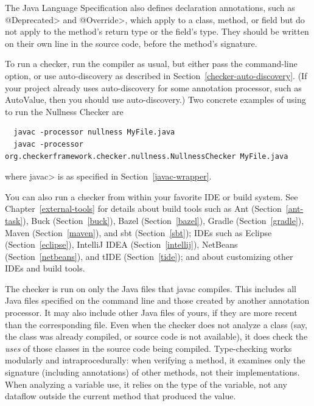 The Java Language Specification also defines
declaration annotations, such as \<@Deprecated> and \<@Override>, which apply
to a class, method, or field but do not apply to the method's return type
or the field's type.  They should be written on their own line in the
source code, before the method's signature.



To run a checker, run the compiler  as usual,
but either pass the  command-line
option, or use auto-discovery as described in
Section~\ref{checker-auto-discovery}.
(If your project already uses auto-discovery for some annotation processor,
such as AutoValue, then you should use auto-discovery.)
Two concrete examples of using  to run the Nullness Checker are

\begin{Verbatim}
  javac -processor nullness MyFile.java
  javac -processor org.checkerframework.checker.nullness.NullnessChecker MyFile.java
\end{Verbatim}

\noindent
where \<javac> is as specified in Section~\ref{javac-wrapper}.

You can also run a checker from within your favorite IDE or build system.  See
Chapter~\ref{external-tools} for details about build tools such as
Ant (Section~\ref{ant-task}),
Buck (Section~\ref{buck}),
Bazel (Section~\ref{bazel}),
Gradle (Section~\ref{gradle}),
Maven (Section~\ref{maven}), and
sbt (Section~\ref{sbt});
IDEs such as
Eclipse (Section~\ref{eclipse}),
IntelliJ IDEA (Section~\ref{intellij}),
NetBeans (Section~\ref{netbeans}),
and
tIDE (Section~\ref{tide});
and about customizing other IDEs and build tools.

The checker is run on only the Java files that javac compiles.
This includes all Java files specified on the command line and those
created by another annotation processor.  It may also include other Java
files of yours, if they are more recent than the corresponding  file.
Even when the checker does not analyze a class (say, the class was
already compiled, or source code is not available), it does check
the \emph{uses} of those classes in the source code being compiled.
Type-checking works modularly and intraprocedurally:  when verifying a
method, it examines only the signature (including annotations) of other
methods, not their implementations.  When analyzing a variable use, it
relies on the type of the variable, not any dataflow outside the current
method that produced the value.

